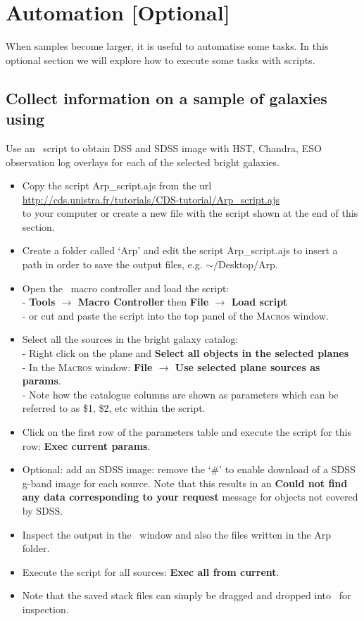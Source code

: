 \documentclass [a4paper, 12pt]{article}
\begin{document}
\section{Automation [Optional]}
When samples become larger, it is useful to automatise some tasks. In this
optional section we will explore how to execute some tasks with
scripts.

\subsection{Collect information on a sample of galaxies using \aladin}

Use an \aladin\ script to obtain DSS and SDSS image with HST, Chandra, ESO
observation log overlays for each of the selected bright galaxies.
\renewcommand\UrlFont{\color{blue}\rmfamily}
\begin{itemize}
    \item Copy the script Arp\_script.ajs from the url \\
    \url{http://cds.unistra.fr/tutorials/CDS-tutorial/Arp_script.ajs} \\
     to your computer or create a new file with the script shown at the end
    of this section.
    \item Create a folder called `Arp' and edit the script Arp\_script.ajs to
    insert a path in order to save the output files, e.g. $\sim$/Desktop/Arp.
    \item Open the \aladin\ macro controller and load the script:\\
    - \textbf{Tools $\rightarrow$ Macro Controller} then \textbf{File
    $\rightarrow$ Load script}\\
    - or cut and paste the script into the top panel of the \textsc{Macros}
    window.
    \item Select all the sources in the bright galaxy catalog:\\
    - Right click on the plane and \textbf{Select all objects in the selected
    planes}\\
    - In the \textsc{Macros} window: \textbf{File $\rightarrow$ Use selected
    plane sources as params}.\\
    - Note how the catalogue columns are shown as parameters which can be
    referred to as \$1, \$2, etc within the script.
    \item Click on the first row of the parameters table and execute the
script
    for this row: \textbf{Exec current params}.
    \item Optional: add an SDSS image: remove the `\#' to enable download of a
    SDSS g-band image for each source. Note that this results in an
    \textbf{Could not find any data corresponding to your request} message for
    objects not covered by SDSS.
    \item Inspect the output in the \aladin\ window and also the files written
    in the Arp folder.
    \item Execute the script for all sources: \textbf{Exec all from current}.
    \item Note that the saved stack files can simply be dragged and dropped
    into \aladin\ for inspection.
\end{itemize}
\end{document}
